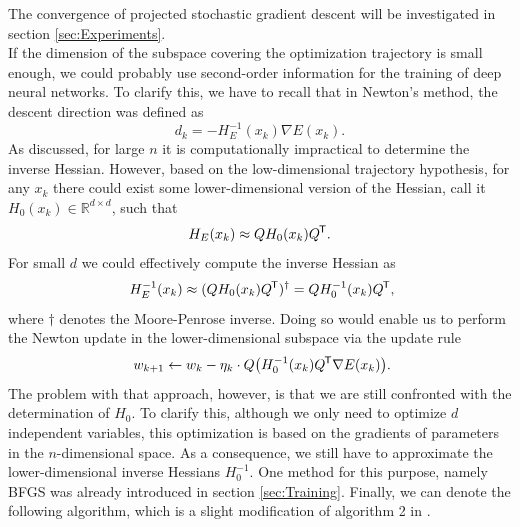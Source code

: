 \documentclass[11pt, a4paper]{article}
\newcommand{\R}{\mathbb{R}}
\newcommand*{\tr}{^{\mkern-1.5mu\mathsf{T}}}
\begin{document}
The convergence of projected stochastic gradient descent will be investigated in section \ref{sec:Experiments}. \\

If the dimension of the subspace covering the optimization trajectory is small enough, we could probably use second-order information for the training of deep neural networks. To clarify this, we have to recall that in Newton's method, the descent direction was defined as
\[ d_k = - H_E^{-1}(x_k) \nabla E(x_k). \]
As discussed, for large $n$ it is computationally impractical to determine the inverse Hessian. However, based on the low-dimensional trajectory hypothesis, for any $x_k$ there could exist some lower-dimensional version of the Hessian, call it $H_0(x_k) \in \R^{d \times d}$, such that
\[ H_E(x_k) \approx Q H_0(x_k) Q \tr. \]
For small $d$ we could effectively compute the inverse Hessian as
\[ H_E^{-1}(x_k) \approx ( Q H_0(x_k) Q \tr )^\dagger = Q H_0^{-1}(x_k) Q \tr, \]
where $\dagger$ denotes the Moore-Penrose inverse. Doing so would enable us to perform the Newton update in the lower-dimensional subspace via the update rule
\[ w_{k+1} \leftarrow w_k - \eta_k \cdot Q \big (H_0^{-1}(x_k) Q \tr \nabla E(x_k) \big ). \]
The problem with that approach, however, is that we are still confronted with the determination of $H_0$. To clarify this, although we only need to optimize $d$ independent variables, this optimization is based on the gradients of parameters in the $n$-dimensional space. As a consequence, we still have to approximate the lower-dimensional inverse Hessians $H_0^{-1}$. One method for this purpose, namely BFGS was already introduced in section \ref{sec:Training}. Finally, we can denote the following algorithm, which is a slight modification of algorithm 2 in \cite{Paper}.
\end{document}
